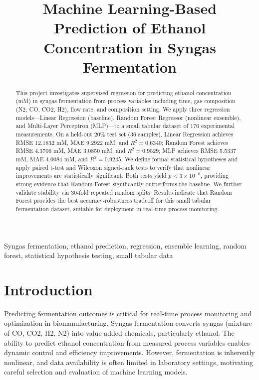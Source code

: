 \documentclass[conference]{IEEEtran}
\title{Machine Learning-Based Prediction of Ethanol Concentration in Syngas Fermentation}
\author{\IEEEauthorblockN{Ying Tan}
\IEEEauthorblockA{CIS 732 / CIS 830, Kansas State University}}
\begin{document}
\maketitle

\begin{abstract}
This project investigates supervised regression for predicting ethanol concentration (mM) in syngas fermentation from process variables including time, gas composition (N2, CO, CO2, H2), flow rate, and composition setting. We apply three regression models—Linear Regression (baseline), Random Forest Regressor (nonlinear ensemble), and Multi-Layer Perceptron (MLP)—to a small tabular dataset of 176 experimental measurements. On a held-out 20\% test set (36 samples), Linear Regression achieves RMSE 12.1832 mM, MAE 9.2922 mM, and $R^2=0.6340$; Random Forest achieves RMSE 4.3706 mM, MAE 3.0850 mM, and $R^2=0.9529$; MLP achieves RMSE 5.5337 mM, MAE 4.0084 mM, and $R^2=0.9245$. We define formal statistical hypotheses and apply paired t-test and Wilcoxon signed-rank tests to verify that nonlinear improvements are statistically significant. Both tests yield $p<3\times10^{-6}$, providing strong evidence that Random Forest significantly outperforms the baseline. We further validate stability via 30-fold repeated random splits. Results indicate that Random Forest provides the best accuracy-robustness tradeoff for this small tabular fermentation dataset, suitable for deployment in real-time process monitoring.
\end{abstract}

\begin{IEEEkeywords}
Syngas fermentation, ethanol prediction, regression, ensemble learning, random forest, statistical hypothesis testing, small tabular data
\end{IEEEkeywords}

\section{Introduction}
Predicting fermentation outcomes is critical for real-time process monitoring and optimization in biomanufacturing. Syngas fermentation converts syngas (mixture of CO, CO2, H2, N2) into value-added chemicals, particularly ethanol. The ability to predict ethanol concentration from measured process variables enables dynamic control and efficiency improvements. However, fermentation is inherently nonlinear, and data availability is often limited in laboratory settings, motivating careful selection and evaluation of machine learning models.
\end{document}
